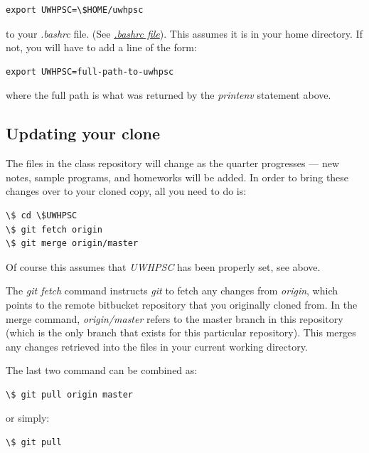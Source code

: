 \documentclass[letterpaper,10pt,english]{sphinxmanual}
\begin{document}
\begin{Verbatim}[commandchars=\\\{\}]
export UWHPSC=\$HOME/uwhpsc
\end{Verbatim}

to your \emph{.bashrc} file.  (See {\hyperref[unix:bashrc]{\emph{.bashrc file}}}).  This assumes it is in your
home directory.  If not, you will have to add a line of the form:

\begin{Verbatim}[commandchars=\\\{\}]
export UWHPSC=full-path-to-uwhpsc
\end{Verbatim}

where the full path is what was returned by the \emph{printenv} statement above.


\subsection{Updating your clone}
\label{git:uwhpsc-update}\label{git:updating-your-clone}
The files in the class repository will change as the quarter progresses ---
new notes, sample programs, and homeworks will be added.  In order
to bring these changes over to your cloned copy, all you need to do is:

\begin{Verbatim}[commandchars=\\\{\}]
\$ cd \$UWHPSC
\$ git fetch origin
\$ git merge origin/master
\end{Verbatim}

Of course this assumes that \emph{UWHPSC} has been properly set, see above.

The \emph{git fetch} command instructs \emph{git} to fetch any changes from \emph{origin},
which points to the remote bitbucket repository that you originally cloned
from.  In the merge command, \emph{origin/master} refers to the master branch
in this repository (which
is the only branch that exists for this particular repository).
This merges any changes retrieved into the files in your current working
directory.

The last two command can be combined as:

\begin{Verbatim}[commandchars=\\\{\}]
\$ git pull origin master
\end{Verbatim}

or simply:

\begin{Verbatim}[commandchars=\\\{\}]
\$ git pull
\end{Verbatim}
\end{document}
